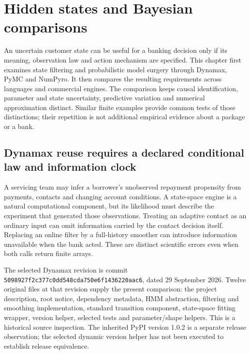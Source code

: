 \chapter{Hidden states and Bayesian comparisons}

An uncertain customer state can be useful for a banking decision only if its
meaning, observation law and action mechanism are specified. This chapter first
examines state filtering and probabilistic model surgery through Dynamax, PyMC
and NumPyro. It then compares the resulting requirements across languages and
commercial engines. The comparison keeps causal identification, parameter and
state uncertainty, predictive variation and numerical approximation distinct.
Similar finite examples provide common tests of those distinctions; their
repetition is not additional empirical evidence about a package or a bank.




\section{Dynamax reuse requires a declared conditional law and information clock}
\label{exec19:dynamax-scope}

A servicing team may infer a borrower's unobserved repayment propensity from
payments, contacts and changing account conditions. A state-space engine is a
natural computational component, but its likelihood must describe the experiment
that generated those observations. Treating an adaptive contact as an ordinary
input can omit information carried by the contact decision itself. Replacing an
online filter by a full-history smoother can introduce information unavailable
when the bank acted. These are distinct scientific errors even when both calls
return finite arrays.

The selected Dynamax revision is commit
\texttt{5098927f2c377c0dd548cda750e6f1436220aac6}, dated 29 September 2026.
Twelve original files at that revision supply the present comparison: the
project description, root notice, dependency metadata, HMM abstraction,
filtering and smoothing implementation, standard transition component,
state-space fitting wrapper, version helper, selected tests and parameter/shape
helpers. This is a historical source inspection. The inherited PyPI version
1.0.2 is a separate release observation; the selected dynamic version helper
has not been executed to establish release equivalence.~\citep{exec19_dynamax_source}

